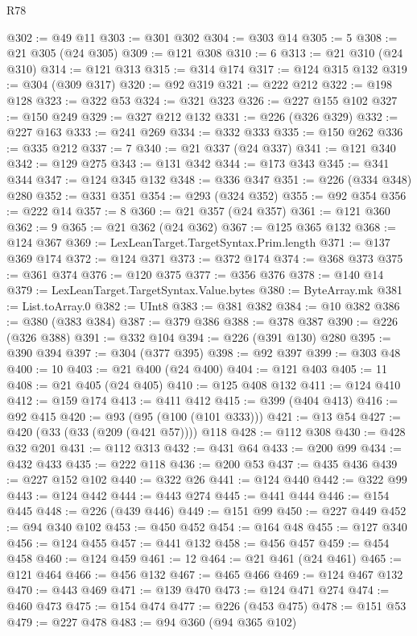 \begin{lexlean}{R78}
\begin{coremodule}
@302 := @49 @11
@303 := @301 @302
@304 := @303 @14
@305 := 5
@308 := @21 @305 (@24 @305)
@309 := @121 @308
@310 := 6
@313 := @21 @310 (@24 @310)
@314 := @121 @313
@315 := @314 @174
@317 := @124 @315 @132
@319 := @304 (@309 @317)
@320 := @92 @319
@321 := @222 @212
@322 := @198 @128
@323 := @322 @53
@324 := @321 @323
@326 := @227 @155 @102
@327 := @150 @249
@329 := @327 @212 @132
@331 := @226 (@326 @329)
@332 := @227 @163
@333 := @241 @269
@334 := @332 @333
@335 := @150 @262
@336 := @335 @212
@337 := 7
@340 := @21 @337 (@24 @337)
@341 := @121 @340
@342 := @129 @275
@343 := @131 @342
@344 := @173 @343
@345 := @341 @344
@347 := @124 @345 @132
@348 := @336 @347
@351 := @226 (@334 @348) @280
@352 := @331 @351
@354 := @293 (@324 @352)
@355 := @92 @354
@356 := @222 @14
@357 := 8
@360 := @21 @357 (@24 @357)
@361 := @121 @360
@362 := 9
@365 := @21 @362 (@24 @362)
@367 := @125 @365 @132
@368 := @124 @367
@369 := LexLeanTarget.TargetSyntax.Prim.length
@371 := @137 @369 @174
@372 := @124 @371
@373 := @372 @174
@374 := @368 @373
@375 := @361 @374
@376 := @120 @375
@377 := @356 @376
@378 := @140 @14
@379 := LexLeanTarget.TargetSyntax.Value.bytes
@380 := ByteArray.mk
@381 := List.toArray.{0}
@382 := UInt8
@383 := @381 @382
@384 := @10 @382
@386 := @380 (@383 @384)
@387 := @379 @386
@388 := @378 @387
@390 := @226 (@326 @388)
@391 := @332 @104
@394 := @226 (@391 @130) @280
@395 := @390 @394
@397 := @304 (@377 @395)
@398 := @92 @397
@399 := @303 @48
@400 := 10
@403 := @21 @400 (@24 @400)
@404 := @121 @403
@405 := 11
@408 := @21 @405 (@24 @405)
@410 := @125 @408 @132
@411 := @124 @410
@412 := @159 @174
@413 := @411 @412
@415 := @399 (@404 @413)
@416 := @92 @415
@420 := @93 (@95 (@100 (@101 @333)))
@421 := @13 @54
@427 := @420 (@33 (@33 (@209 (@421 @57)))) @118
@428 := @112 @308
@430 := @428 @32 @201
@431 := @112 @313
@432 := @431 @64
@433 := @200 @99
@434 := @432 @433
@435 := @222 @118
@436 := @200 @53
@437 := @435 @436
@439 := @227 @152 @102
@440 := @322 @26
@441 := @124 @440
@442 := @322 @99
@443 := @124 @442
@444 := @443 @274
@445 := @441 @444
@446 := @154 @445
@448 := @226 (@439 @446)
@449 := @151 @99
@450 := @227 @449
@452 := @94 @340 @102
@453 := @450 @452
@454 := @164 @48
@455 := @127 @340
@456 := @124 @455
@457 := @441 @132
@458 := @456 @457
@459 := @454 @458
@460 := @124 @459
@461 := 12
@464 := @21 @461 (@24 @461)
@465 := @121 @464
@466 := @456 @132
@467 := @465 @466
@469 := @124 @467 @132
@470 := @443 @469
@471 := @139 @470
@473 := @124 @471 @274
@474 := @460 @473
@475 := @154 @474
@477 := @226 (@453 @475)
@478 := @151 @53
@479 := @227 @478
@483 := @94 @360 (@94 @365 @102)

\end{coremodule}
\end{lexlean}
